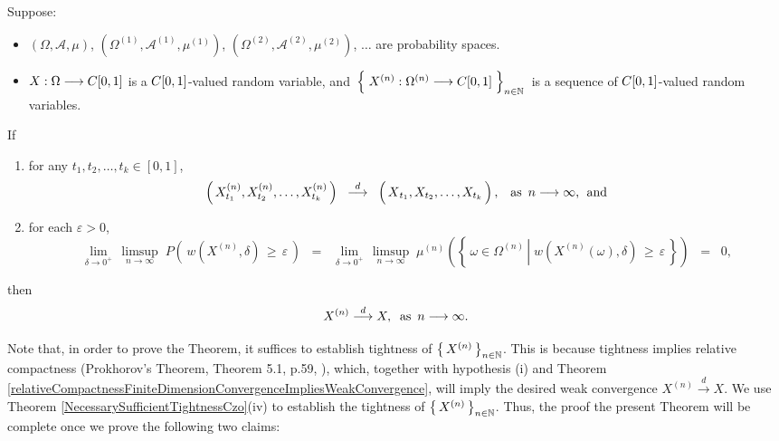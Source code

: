 \begin{theorem}
\mbox{}\vskip 0.1cm
\noindent
Suppose:
\begin{itemize}
\item	$\left(\Omega,\mathcal{A},\mu\right)$,
		$\left(\Omega^{(1)},\mathcal{A}^{(1)},\mu^{(1)}\right)$,
		$\left(\Omega^{(2)},\mathcal{A}^{(2)},\mu^{(2)}\right)$,
		$\dots$\;
		are probability spaces.
\item	$X : \Omega \longrightarrow C[0,1]$ is a $C[0,1]$-valued random variable, and
		\,$\left\{\;X^{(n)} : \Omega^{(n)} \overset{{\color{white}1}}{\longrightarrow} \Czo\;\right\}_{n\in\N}$\,
		is a sequence of $C[0,1]$-valued random variables.
\end{itemize}
If
\begin{enumerate}
\item	for any $t_{1}, t_{2}, \ldots, t_{k} \in [0,1]$,
		\begin{equation*}
		\left(\,X^{(n)}_{t_{1}},X^{(n)}_{t_{2}},\ldots,X^{(n)}_{t_{k}}\,\right)
		\;\; \overset{d}{\longrightarrow} \;\;
		\left(\,\overset{{\color{white}.}}{X}_{t_{1}},X_{t_{2}},\ldots,X_{t_{k}}\,\right),
		\;\;\;\textnormal{as \,$n \longrightarrow \infty$,\; and}
		\end{equation*}
\item	for each $\varepsilon > 0$,
		\begin{equation*}
			\underset{\delta\rightarrow 0^{+}}{\lim}\,
			\underset{n\rightarrow\infty}{\limsup}\;
			P\!\left(\, w(X^{(n)},\delta) \,\geq\, \varepsilon \,\right)
		\;\; = \;\;
			\underset{\delta\rightarrow 0^{+}}{\lim}\,
			\underset{n\rightarrow\infty}{\limsup}\;
			\mu^{(n)}\!\left(\left\{\,
				\omega \in \Omega^{(n)}
				\,\left\vert\;
					w(X^{(n)}(\omega),\delta) \,\geq\, \varepsilon
				\right.
			\,\right\}\right)
		\;\; = \;\;
			0,
		\end{equation*}
\end{enumerate}
then
\begin{equation*}
X^{(n)} \overset{d}{\longrightarrow} X,
\;\;\textnormal{as \,$n \longrightarrow \infty$}.
\end{equation*}
\end{theorem}
\proof
Note that, in order to prove the Theorem, it suffices to establish tightness of $\left\{\,X^{(n)}\,\right\}_{n\in\mathbb{N}}$.
This is because tightness implies relative compactness (Prokhorov's Theorem, Theorem 5.1, p.59, \cite{Billingsley1999}),
which, together with hypothesis (i) and
Theorem \ref{relativeCompactnessFiniteDimensionConvergenceImpliesWeakConvergence},
will imply the desired weak convergence $X^{(n)} \overset{d}{\longrightarrow} X$.
We use Theorem \ref{NecessarySufficientTightnessCzo}(iv)
to establish the tightness of $\left\{\,X^{(n)}\,\right\}_{n\in\mathbb{N}}$.
Thus, the proof the present Theorem will be complete once we prove the following two claims:

